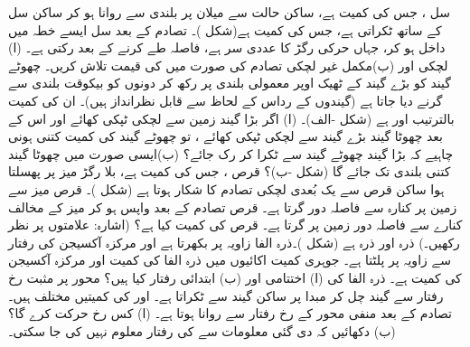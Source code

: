 سل ، جس کی کمیت  ہے، ساکن حالت سے میلان پر  بلندی سے روانا ہو کر ساکن  سل   کے ساتھ ٹکراتی ہے، جس کی کمیت  ہے(شکل )۔ تصادم کے بعد سل  ایسے خطہ میں داخل ہو کر، جہاں حرکی رگڑ کا عددی سر  ہے،  فاصلہ  طے کرنے کے بعد رکتی ہے۔ (ا) لچکی اور (ب)مکمل  غیر لچکی  تصادم کی صورت میں  کی قیمت تلاش کریں۔
چھوٹے گیند کو بڑے گیند کے ٹھیک اوپر  معمولی  بلندی پر  رکھ کر دونوں کو بیکوقت  بلندی سے  گرنے دیا جاتا ہے (گیندوں کے رداس   کے لحاظ سے قابل نظرانداز ہیں)۔ ان کی کمیت بالترتیب  اور  ہے (شکل -الف)۔ (ا) اگر   بڑا گیند زمین سے لچکی ٹپکی کھائے اور  اس کے بعد چھوٹا گیند  بڑے گیند سے لچکی ٹپکی کھائے ، تو چھوٹے گیند کی کمیت  کتنی  ہونی چاہیے کہ بڑا گیند  چھوٹے گیند سے ٹکرا کر رک جائے؟ (ب)ایسی صورت میں   چھوٹا گیند  کتنی بلندی تک جائے گا  (شکل -ب)؟
قرص ، جس کی کمیت  ہے،  بلا رگڑ میز پر پھسلتا ہوا  ساکن قرص  سے یک بُعدی لچکی تصادم کا شکار ہوتا  ہے (شکل )۔ قرص  میز سے زمین پر کنارہ سے  فاصلہ دور گرتا ہے۔ قرص    تصادم کے بعد واپس  ہو کر  میز کے مخالف کنارے سے  فاصلہ دور زمین پر گرتا ہے۔ قرص  کی کمیت کیا ہے؟ (اشارہ: علامتوں پر نظر رکھیں۔)
ذرہ   اور ذرہ   ہے (شکل )۔ذرہ  الفا زاویہ    پر بکھرتا  ہے اور مرکزہ آکسیجن   کی رفتار  سے زاویہ   پر پلٹتا ہے۔ جوہری کمیت اکائیوں میں ذرہ الفا  کی کمیت
  اور  مرکزہ آکسیجن کی کمیت  ہے۔ ذرہ الفا کی (ا) اختتامی اور (ب) ابتدائی رفتار کیا ہیں؟
محور   پر مثبت  رخ    رفتار سے گیند   چل کر مبدا پر ساکن گیند  سے ٹکراتا ہے۔ اور   کی کمیتیں مختلف ہیں۔ تصادم کے  بعد  منفی  محور  کے رخ  رفتار سے روانا ہوتا ہے۔ (ا)  کس رخ  حرکت کرے گا؟ (ب)  دکھائیں کہ دی گئی معلومات سے  کی رفتار معلوم نہیں کی جا سکتی۔
